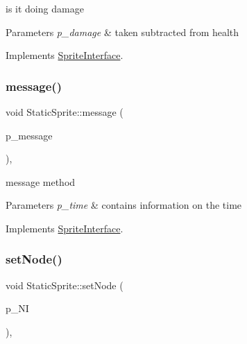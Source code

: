 is it doing damage 


\begin{DoxyParams}{Parameters}
{\em p\+\_\+damage} & taken subtracted from health \\
\hline
\end{DoxyParams}


Implements \mbox{\hyperlink{class_sprite_interface_a91a747b887e19cfc6e5256d4afc2f64c}{Sprite\+Interface}}.

\mbox{\label{class_static_sprite_afe24127ebfb8a93de80fb42729a5f249}} 
\subsubsection{\texorpdfstring{message()}{message()}}
{\footnotesize\ttfamily void Static\+Sprite\+::message (\begin{DoxyParamCaption}\item[{const std\+::string}]{p\+\_\+message }\end{DoxyParamCaption})\hspace{0.3cm}{\ttfamily [override]}, {\ttfamily [virtual]}}



message method 


\begin{DoxyParams}{Parameters}
{\em p\+\_\+time} & contains information on the time \\
\hline
\end{DoxyParams}


Implements \mbox{\hyperlink{class_sprite_interface_ad5335c5370f97cd81a52769cb0a25559}{Sprite\+Interface}}.

\mbox{\label{class_static_sprite_a39f0883a2c8933804ab6bd172cdc02fd}} 
\subsubsection{\texorpdfstring{set\+Node()}{setNode()}}
{\footnotesize\ttfamily void Static\+Sprite\+::set\+Node (\begin{DoxyParamCaption}\item[{\mbox{\hyperlink{class_node_interface}{Node\+Interface}} $\ast$}]{p\+\_\+\+NI }\end{DoxyParamCaption})\hspace{0.3cm}{\ttfamily [override]}, {\ttfamily [virtual]}}



